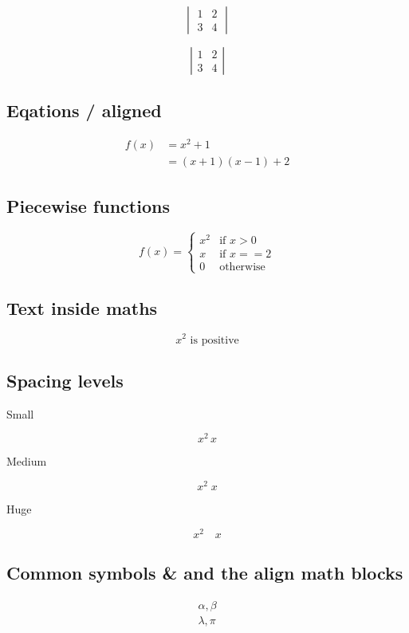 \documentclass{article}
\begin{document}
\[
\begin{vmatrix}
    1 & 2 \\
    3 & 4
\end{vmatrix}
\]

\[
\left|
\begin{matrix}
    1 & 2 \\
    3 & 4
\end{matrix}
\right|
\]

\subsection{Eqations / aligned}

\begin{align}
f(x) &= x^2 + 1 \\
     &= (x+1)(x-1) + 2
\end{align}

\subsection{Piecewise functions}

\[
f(x) = 
\begin{cases}
    x^2 & \text{if } x > 0 \\
    x & \text{if } x == 2 \\
    0 & \text{otherwise}
\end{cases}
\]

\subsection{Text inside maths}

\[
x^2 \text{ is positive}
\]

\subsection{Spacing levels}

Small

\[
x^2 \, x
\]

Medium

\[
x^2 \; x
\]

Huge

\[
x^2 \quad x
\]

\subsection{Common symbols \& and the align math blocks}

\begin{align}
\alpha, \beta \\ 
\lambda, \pi
\end{align}
\end{document}
